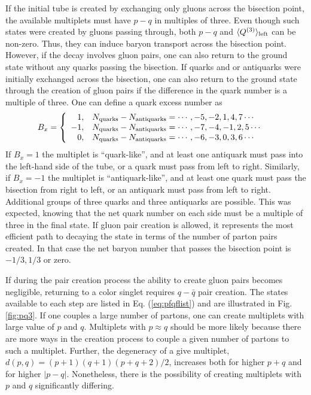 \documentclass[aps, prc, 12pt, nofootinbib, showpacs, superscriptaddress, tightenlines, groupedaddress]{revtex4-2}
\begin{document}
If the initial tube is created by exchanging only gluons across the bisection point, the available multiplets must have $p-q$ in multiples of three. Even though such states were created by gluons passing through, both $p-q$ and $\langle Q^{(3)}\rangle_{\rm left}$ can be non-zero. Thus, they can induce baryon transport across the bisection point. However, if the decay involves gluon pairs, one can also return to the ground state without any quarks passing the bisection. If quarks and or antiquarks were initially exchanged across the bisection, one can also return to the ground state through the creation of gluon pairs if the difference in the quark number is a multiple of three. One can define a quark excess number as
\begin{eqnarray}
B_x&=\left\{\begin{array}{rl}
1,&N_{\rm quarks}-N_{\rm antiquarks}=\cdots,-5,-2,1,4,7\cdots\\
-1,&N_{\rm quarks}-N_{\rm antiquarks}=\cdots,-7,-4,-1,2,5\cdots\\
0, &N_{\rm quarks}-N_{\rm antiquarks}=\cdots,-6,-3,0,3,6\cdots
\end{array}\right.
\end{eqnarray}
If $B_x=1$ the multiplet is ``quark-like'', and at least one antiquark must pass into the left-hand side of the tube, or a quark must pass from left to right. Similarly, if $B_x=-1$ the multiplet is ``antiquark-like'', and at least one quark must pass the bisection from right to left, or an antiquark must pass from left to right. Additional groups of three quarks and three antiquarks are possible. This was expected, knowing that the net quark number on each side must be a multiple of three in the final state. If gluon pair creation is allowed, it represents the most efficient path to decaying the state in terms of the number of parton pairs created. In that case the net baryon number that passes the bisection point is $-1/3,1/3$ or zero.

If during the pair creation process the ability to create gluon pairs becomes negligible, returning to a color singlet requires $q-\bar{q}$ pair creation. The states available to each step are listed in Eq. (\ref{eq:pfqflist}) and are illustrated in Fig. \ref{fig:pq3}. If one couples a large number of partons, one can create multiplets with large value of $p$ and $q$. Multiplets with $p\approx q$ should be more likely because there are more ways in the creation process to couple a given number of partons to such a multiplet. Further, the degeneracy of a give multiplet, $d(p,q)=(p+1)(q+1)(p+q+2)/2$, increases both for higher $p+q$ and for higher $|p-q|$. Nonetheless, there is the possibility of creating multiplets with $p$ and $q$ significantly differing.
\end{document}
